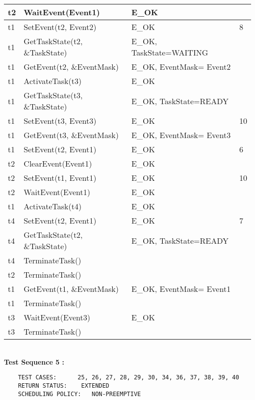 \documentclass[10pt]{article}
\newlength{\Li}\settowidth{\Li}{Running}
\newlength{\Lii}\setlength{\Lii}{7cm}
\newlength{\Liiii}\setlength{\Liiii}{0.9cm}
\newlength{\Liii}\setlength{\Liii}{\textwidth} \addtolength{\Liii}{-\Li} \addtolength{\Liii}{-\Lii} \addtolength{\Liii}{-\Liiii}
\begin{document}
	\begin{supertabular}{|p{\Li}|p{\Lii}|p{\Liii}|p{\Liiii}|} \hline 
	t2 	& WaitEvent(Event1) 				& E\_OK 					&  \\ \hline
	t1 	& SetEvent(t2, Event2) 				& E\_OK 					& 8 \\ \hline
	t1	& GetTaskState(t2, \&TaskState) 		& E\_OK, TaskState=WAITING	&\\ \hline
	t1 	& GetEvent(t2, \&EventMask) 			& E\_OK, EventMask= Event2	&  \\ \hline
	t1 	& ActivateTask(t3) 					& E\_OK					&  \\ \hline
	t1	& GetTaskState(t3, \&TaskState) 		& E\_OK, TaskState=READY	&  \\ \hline
	t1	& SetEvent(t3, Event3) 				& E\_OK					& 10\endnotemark[1] \\ \hline
	t1	& GetEvent(t3, \&EventMask) 			& E\_OK, EventMask= Event3	& 	\\ \hline
	t1 	& SetEvent(t2, Event1)				& E\_OK 					& 6 \\ \hline
	t2 	& ClearEvent(Event1) 				& E\_OK 					&  \\ \hline
	t2 	& SetEvent(t1, Event1)				& E\_OK 					& 10 \\ \hline
	t2 	& WaitEvent(Event1)					& E\_OK					& \\ \hline
	t1	& ActivateTask(t4) 					& E\_OK					& \\ \hline
	t4	& SetEvent(t2, Event1)				& E\_OK 					& 7 \\ \hline
	t4	& GetTaskState(t2, \&TaskState) 		& E\_OK, TaskState=READY	& \\ \hline
	t4	& TerminateTask() 					&						&\\ \hline
	t2	& TerminateTask() 					&						&\\ \hline
	t1 	& GetEvent(t1, \&EventMask) 			& E\_OK, EventMask= Event1	&  \\ \hline
	t1	& TerminateTask() 					&						&\\ \hline
	t3 	& WaitEvent(Event3) 				& E\_OK 					&  \\ \hline
	t3	& TerminateTask() 					&						&\\ \hline
	\end{supertabular}\\
	
	\textbf{Test Sequence 5 :}
	\begin{lstlisting}
	TEST CASES:		 25, 26, 27, 28, 29, 30, 34, 36, 37, 38, 39, 40
	RETURN STATUS:	  EXTENDED 
	SCHEDULING POLICY:   NON-PREEMPTIVE
	\end{lstlisting}
	
\end{document}
